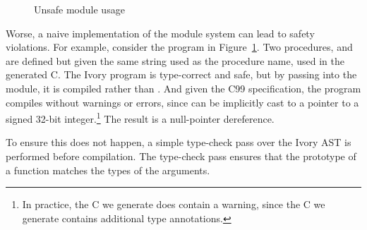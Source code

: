 \begin{figure}[ht]
\caption{Unsafe module usage}
\label{fig:unsafe-module}
\end{figure}

Worse, a naive implementation of the module system can lead to safety
violations. For example, consider the program in
Figure~\ref{fig:unsafe-module}. Two procedures,  and 
are defined but given the same string used as the procedure name, used in the
generated C. The Ivory program is type-correct and safe, but by passing
 into the module, it is compiled rather than . And given
the C99 specification, the program compiles without warnings or errors, since
 can be implicitly cast to a pointer to a signed 32-bit
integer.\footnote{In practice, the C we generate does contain a warning, since
  the C we generate contains additional type annotations.} The result is a
null-pointer dereference.

To ensure this does not happen, a simple type-check pass over the Ivory AST is
performed before compilation. The type-check pass ensures that the prototype of
a function matches the types of the arguments.
